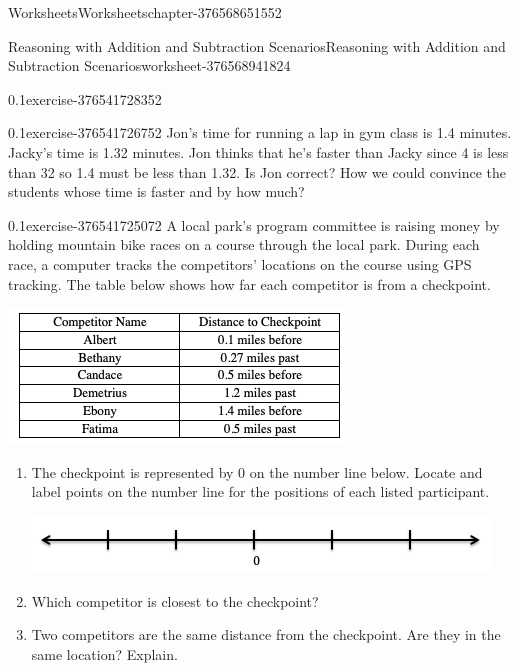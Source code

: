 \documentclass[twoside,11pt,]{book}
\begin{document}
\begin{chapterptx}{Worksheets}{}{Worksheets}{}{}{chapter-376568651552}
\begin{worksheet-section-numberless}{Reasoning with Addition and Subtraction Scenarios}{}{Reasoning with Addition and Subtraction Scenarios}{}{}{worksheet-376568941824}
\begin{divisionexercise}{3}{}{0.1}{exercise-376541728352}
\end{divisionexercise}%
\begin{divisionexercise}{4}{}{0.1}{exercise-376541726752}%
\hypertarget{p-376541726016}{}%
Jon’s time for running a lap in gym class is 1.4 minutes.  Jacky’s time is 1.32 minutes.  Jon thinks that he’s faster than Jacky since 4 is less than 32 so 1.4 must be less than 1.32.  Is Jon correct?  How we could convince the students whose time is faster and by how much?%
\end{divisionexercise}%
\begin{divisionexercise}{5}{}{0.1}{exercise-376541725072}%
\hypertarget{p-376541724336}{}%
A local park’s program committee is raising money by holding mountain bike races on a course through the local park.  During each race, a computer tracks the competitors’ locations on the course using GPS tracking.  The table below shows how far each competitor is from a checkpoint.%
\begin{image}{0}{1}{0}%
\includegraphics[width=1\linewidth]{images/reasoning-table-checkpoint.png}
\end{image}%
\leavevmode%
\begin{enumerate}[label=(\alph*)]
\item\hypertarget{li-376541722688}{}The checkpoint is represented by 0 on the number line below.  Locate and label points on the number line for the positions of each listed participant. \begin{image}{0}{1}{0}%
\includegraphics[width=1\linewidth]{images/blank-number-line.png}
\end{image}%
%
\item\hypertarget{li-376541721648}{}Which competitor is closest to the checkpoint?%
\item\hypertarget{li-376541721264}{}Two competitors are the same distance from the checkpoint.  Are they in the same location?  Explain.%

\end{enumerate}
\end{divisionexercise}
\end{worksheet-section-numberless}
\end{chapterptx}
\end{document}
